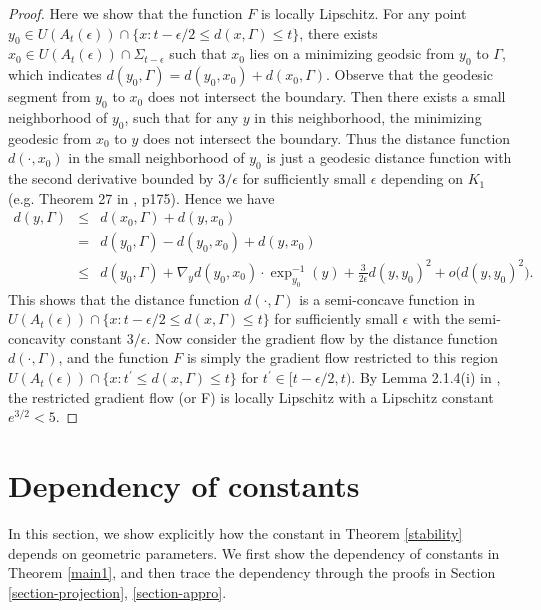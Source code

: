 \documentclass[11pt,letterpaper]{amsart}
\numberwithin{equation}{section}
\theoremstyle{definition}
\theoremstyle{plain}
\theoremstyle{definition}
\theoremstyle{plain}
\theoremstyle{definition}
\theoremstyle{plain}
\begin{document}
\begin{proof}
Here we show that the function $F$ is locally Lipschitz. For any point $y_0 \in U(A_t(\epsilon))\cap\{x: t-\epsilon/2\leqslant d(x,\Gamma)\leqslant t\}$, there exists $x_0\in U(A_t(\epsilon))\cap \Sigma_{t-\epsilon}$ such that $x_0$ lies on a minimizing geodsic from $y_0$ to $\Gamma$, which indicates $d(y_0,\Gamma)=d(y_0,x_0)+d(x_0,\Gamma)$. Observe that the geodesic segment from $y_0$ to $x_0$ does not intersect the boundary. Then there exists a small neighborhood of $y_0$, such that for any $y$ in this neighborhood, the minimizing geodesic from $x_0$ to $y$ does not intersect the boundary. Thus the distance function $d(\cdot,x_0)$ in the small neighborhood of $y_0$ is just a geodesic distance function with the second derivative bounded by $3/\epsilon$ for sufficiently small $\epsilon$ depending on $K_1$ (e.g. Theorem 27 in \cite{PP}, p175). Hence we have
\begin{eqnarray*}
d(y,\Gamma)&\leqslant& d(x_0,\Gamma)+d(y,x_0) \\
&=& d(y_0,\Gamma)-d(y_0,x_0)+d(y,x_0)\\
&\leqslant& d(y_0,\Gamma)+\nabla_y d(y_0,x_0)\cdot \exp^{-1}_{y_0} (y) + \frac{3}{2\epsilon} d(y,y_0)^2+o\big(d(y,y_0)^2\big).
\end{eqnarray*}
This shows that the distance function $d(\cdot,\Gamma)$ is a semi-concave function in $U(A_t(\epsilon))\cap\{x: t-\epsilon/2\leqslant d(x,\Gamma)\leqslant t\}$ for sufficiently small $\epsilon$ with the semi-concavity constant $3/\epsilon$. Now consider the gradient flow by the distance function $d(\cdot,\Gamma)$, and the function $F$ is simply the gradient flow restricted to this region $U(A_t(\epsilon))\cap\{x: t^{\prime}\leqslant d(x,\Gamma)\leqslant t\}$ for $t^{\prime}\in [t-\epsilon/2,t)$. By Lemma 2.1.4(i) in \cite{P}, the restricted gradient flow (or F) is locally Lipschitz with a Lipschitz constant $e^{3/2}<5$.
\end{proof}


\appendix

\section{Dependency of constants}\label{constants}

In this section, we show explicitly how the constant in Theorem \ref{stability} depends on geometric parameters. We first show the dependency of constants in Theorem \ref{main1}, and then trace the dependency through the proofs in Section \ref{section-projection}, \ref{section-appro}.
\end{document}
